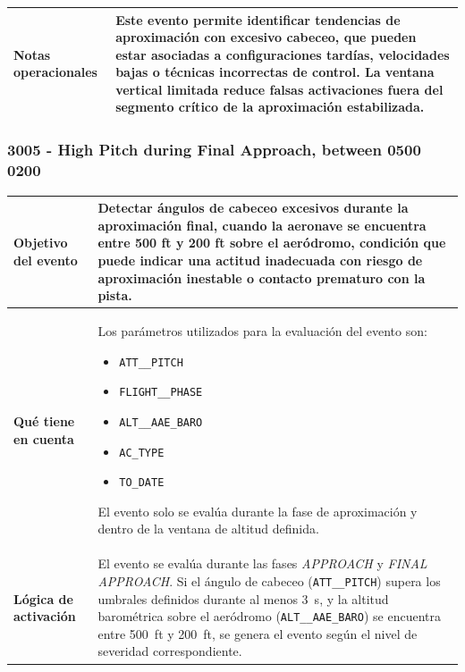 \documentclass[11pt,a4paper]{article}
\begin{document}
\begin{longtable}{p{5cm} p{9.5cm}}
		\textbf{Notas operacionales} &
		Este evento permite identificar tendencias de aproximación con excesivo cabeceo, que pueden estar asociadas a configuraciones tardías, velocidades bajas o técnicas incorrectas de control.  
		La ventana vertical limitada reduce falsas activaciones fuera del segmento crítico de la aproximación estabilizada. \\
		\hline
	\end{longtable}
	
	\subsubsection{3005 - High Pitch during Final Approach, between 0500 0200}
	\begin{longtable}{p{5cm} p{9.5cm}}
		\hline
		\textbf{Objetivo del evento} &
		Detectar ángulos de cabeceo excesivos durante la aproximación final, cuando la aeronave se encuentra entre 500 ft y 200 ft sobre el aeródromo, condición que puede indicar una actitud inadecuada con riesgo de aproximación inestable o contacto prematuro con la pista. \\
		\hline
		\textbf{Qué tiene en cuenta} &
		Los parámetros utilizados para la evaluación del evento son:
		\begin{itemize}
			\item \texttt{ATT\_\_PITCH}
			\item \texttt{FLIGHT\_\_PHASE}
			\item \texttt{ALT\_\_AAE\_BARO}
			\item \texttt{AC\_TYPE}
			\item \texttt{TO\_DATE}
		\end{itemize}
		El evento solo se evalúa durante la fase de aproximación y dentro de la ventana de altitud definida. \\
		\hline
		\textbf{Lógica de activación} &
		El evento se evalúa durante las fases \textit{APPROACH} y \textit{FINAL APPROACH}.  
		Si el ángulo de cabeceo (\texttt{ATT\_\_PITCH}) supera los umbrales definidos durante al menos \SI{3}{s}, y la altitud barométrica sobre el aeródromo (\texttt{ALT\_\_AAE\_BARO}) se encuentra entre \SI{500}{ft} y \SI{200}{ft}, se genera el evento según el nivel de severidad correspondiente.  
		

\end{longtable}
\end{document}
